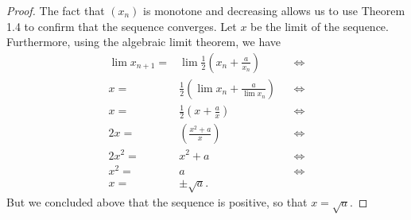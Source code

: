 \begin{proof}
The fact that $(x_n)$ is monotone and decreasing allows us to use Theorem 1.4 to confirm that the sequence converges. Let $x$ be the limit of the sequence. Furthermore, using the algebraic limit theorem, we have
\begin{align*}
    \lim x_{n+1} =& \lim \frac{1}{2}\left(x_n+\frac{a}{x_n}\right) &&\iff\\
    x =& \frac{1}{2}\left(\lim x_n+\frac{a}{\lim x_n}\right) &&\iff\\
    x =& \frac{1}{2}\left(x+\frac{a}{x}\right) &&\iff\\
    2x =& \left(\frac{x^2+a}{x}\right) &&\iff\\
    2x^2 =& x^2+a &&\iff\\
    x^2 =& a &&\iff\\
    x =& \pm\sqrt{a}.
\end{align*}
But we concluded above that the sequence is positive, so that $x=\sqrt{a}$.
\end{proof}

